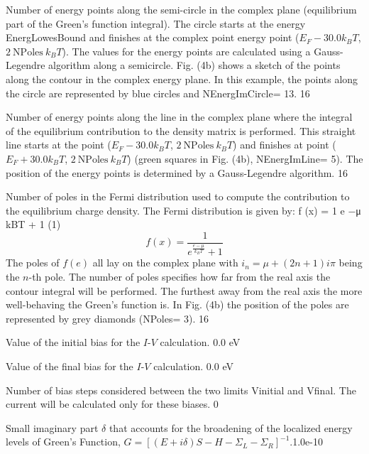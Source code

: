 \documentclass[11pt]{article}
\begin{document}
{Number of energy points along the semi-circle in the complex plane (equilibrium part of the Green's function integral). The circle starts at the energy EnergLowesBound and finishes at the complex point energy point ($E_F - 30.0 k_BT$, $2~\mathrm{NPoles}~k_BT$). The values for the energy points are calculated using a Gauss-Legendre algorithm along a semicircle. Fig.  (4b) shows a sketch of the points along the contour in the complex energy plane. In this example, the points along the circle are represented by blue circles and NEnergImCircle= 13.}
{16}

{Number of energy points along the line in the complex plane where the integral of the equilibrium contribution to the density matrix is performed. This straight line starts at the point ($E_F - 30.0 k_BT$, $2~\mathrm{NPoles}~k_BT$) and finishes at point ($E_F + 30.0 k_BT$, $2~\mathrm{NPoles}~k_BT$) (green squares in Fig. (4b), NEnergImLine= 5). The position of the energy points is determined by a Gauss-Legendre algorithm.}
{16}

{Number of poles in the Fermi distribution used to compute the contribution to the equilibrium charge density. The Fermi distribution is given by:
f (x) = 1 e −μ kBT + 1 (1)
\begin{equation}
f(x)=\frac{1}{e^{\frac{e-\mu}{k_BT}}+1}
\end{equation}
The poles of $f(e)$ all lay on the complex plane with $i_n = \mu + (2 n + 1) i \pi$ being the $n$-th pole. The number of poles specifies how far from the real axis the contour integral will be performed. The furthest away from the real axis the more well-behaving the Green's function is.  In Fig. (4b) the position of the poles are represented by grey diamonds (NPoles= 3).}
{16}

{Value of the initial bias for the $I$-$V$ calculation.}
{0.0 eV}

{Value of the final bias for the $I$-$V$ calculation.}
{0.0 eV}

{Number of bias steps considered between the two limits Vinitial and Vfinal. The current will be calculated only for these biases.}
{0}

{Small imaginary part $\delta$ that accounts for the broadening of the localized energy levels of Green's Function, $G=\left[(E+i\delta)S-H-\Sigma_L-\Sigma_R\right]^{-1}$.}{1.0e-10}
\end{document}
